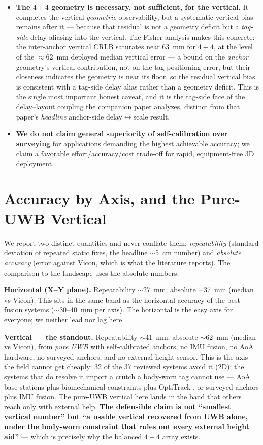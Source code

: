 \documentclass[11pt,a4paper]{article}
\begin{document}
\begin{itemize}
      ground-truth-validated numbers are reported as accuracy.
\item \textbf{The $4{+}4$ geometry is necessary, not sufficient, for the vertical.} It completes the
      vertical \emph{geometric} observability, but a systematic vertical bias remains after it ---
      because that residual is not a geometry deficit but a \emph{tag-side} delay aliasing into the vertical. The Fisher
      analysis makes this concrete: the inter-anchor vertical CRLB saturates near $63$~mm for $4{+}4$,
      at the level of the ${\approx}62$~mm deployed median vertical error --- a bound on the \emph{anchor}
      geometry's vertical contribution, not on the tag positioning error, but their closeness indicates
      the geometry is near its floor, so the residual vertical bias is consistent with a tag-side delay
      alias rather than a geometry deficit. This is the single most important honest caveat, and it is
      the tag-side face of the delay--layout coupling the companion paper analyzes, distinct from that
      paper's \emph{headline} anchor-side delay$\leftrightarrow$scale result.
\item \textbf{We do not claim general superiority of self-calibration over surveying} for
      applications demanding the highest achievable accuracy; we claim a favorable
      effort/accuracy/cost trade-off for rapid, equipment-free 3D deployment.
\end{itemize}

\section{Accuracy by Axis, and the Pure-UWB Vertical}

We report two distinct quantities and never conflate them: \emph{repeatability} (standard deviation
of repeated static fixes, the headline $\sim$5~cm number) and \emph{absolute accuracy} (error against
Vicon, which is what the literature reports). The comparison to the landscape uses the absolute
numbers.

\textbf{Horizontal (X--Y plane).} Repeatability $\sim$27~mm; absolute $\sim$37~mm (median vs Vicon). This sits in the
same band as the horizontal accuracy of the best fusion systems ($\sim$30--40~mm per axis). The
horizontal is the easy axis for everyone; we neither lead nor lag here.

\textbf{Vertical --- the standout.} Repeatability $\sim$41~mm; absolute $\sim$62~mm (median vs Vicon), from \emph{pure
UWB} with self-calibrated anchors, no IMU fusion, no AoA hardware, no surveyed anchors, and no
external height sensor. This is the axis the field cannot get cheaply: 32 of the 37 reviewed systems
avoid it (2D); the systems that do resolve it import a crutch a body-worn tag cannot use --- AoA base
stations plus biomechanical constraints plus OptiTrack \citep{zihajehzadeh_2017}, or surveyed anchors
plus IMU fusion. The pure-UWB vertical here lands in the band that
others reach only with external help. \textbf{The defensible claim is not ``smallest vertical
number'' but ``a usable vertical recovered from UWB alone, under the body-worn constraint that rules
out every external height aid''} --- which is precisely why the balanced $4{+}4$ array exists.
\end{document}
